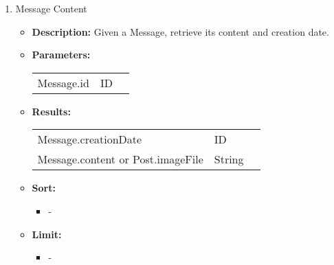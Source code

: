 {\begin{enumerate}
  \item Message Content
    \begin{itemize}
      \item \textbf{Description:}
        Given a Message, retrieve its content and creation date.
      \item \textbf{Parameters:} \\
        \begin{tabular}{lll}
          Message.id 										& ID \\
        \end{tabular}
      \item \textbf{Results:} \\
        \begin{tabular}{lll}
          Message.creationDate   									& ID \\
          Message.content or Post.imageFile           										& String \\
        \end{tabular}
            \item \textbf{Sort:}
                  \begin{itemize}
                    \item[] -
                  \end{itemize}
            \item \textbf{Limit:}
                  \begin{itemize}
                    \item[] -
                  \end{itemize}
    \end{itemize}


\end{enumerate}}
